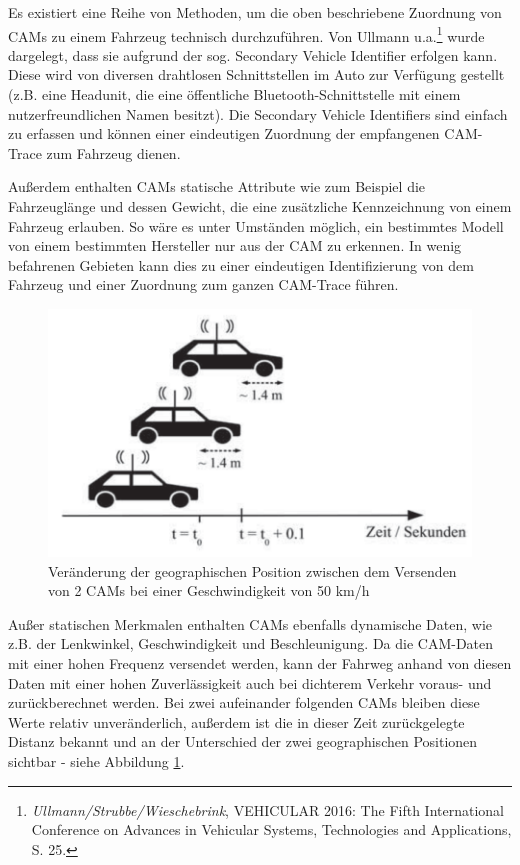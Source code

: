 Es existiert eine Reihe von Methoden, um die oben beschriebene Zuordnung von CAMs zu einem Fahrzeug technisch durchzuführen. Von Ullmann u.a.\footnote{\emph{Ullmann/Strubbe/Wieschebrink}, VEHICULAR 2016: The Fifth International Conference on Advances in Vehicular Systems, Technologies and Applications, S. 25.}\nocite{Ullmann2016} wurde dargelegt, dass sie aufgrund der sog. Secondary Vehicle Identifier erfolgen kann. Diese wird von diversen drahtlosen Schnittstellen im Auto zur Verfügung gestellt (z.B. eine Headunit, die eine öffentliche Bluetooth-Schnittstelle mit einem nutzerfreundlichen Namen besitzt). Die Secondary Vehicle Identifiers sind einfach zu erfassen und können einer eindeutigen Zuordnung der empfangenen CAM-Trace zum Fahrzeug dienen. 

Außerdem enthalten CAMs statische Attribute wie zum Beispiel die Fahrzeuglänge und dessen Gewicht, die eine zusätzliche Kennzeichnung von einem Fahrzeug erlauben. So wäre es unter Umständen möglich, ein bestimmtes Modell von einem bestimmten Hersteller nur aus der CAM zu erkennen. In wenig befahrenen Gebieten kann dies zu einer eindeutigen Identifizierung von dem Fahrzeug und einer Zuordnung zum ganzen CAM-Trace führen. 

\begin{figure}
	\centering
	\includegraphics[width=0.7\linewidth]{images/distanz}
	\caption[Veränderung der geographischen Position zwischen dem Versenden von 2 CAMs bei einer Geschwindigkeit von 50 km/h]{Veränderung der geographischen Position zwischen dem Versenden von 2 CAMs bei einer Geschwindigkeit von 50 km/h\footnotemark}
	\label{fig:distanz}
\end{figure}

Außer statischen Merkmalen enthalten CAMs ebenfalls dynamische Daten, wie z.B. der Lenkwinkel, Geschwindigkeit und Beschleunigung. Da die CAM-Daten mit einer hohen Frequenz versendet werden, kann der Fahrweg anhand von diesen Daten mit einer hohen Zuverlässigkeit auch bei dichterem Verkehr voraus- und zurückberechnet werden. Bei zwei aufeinander folgenden CAMs bleiben diese Werte relativ unveränderlich, außerdem ist die in dieser Zeit zurückgelegte Distanz bekannt und an der Unterschied der zwei geographischen Positionen sichtbar - siehe Abbildung \ref{fig:distanz}.

